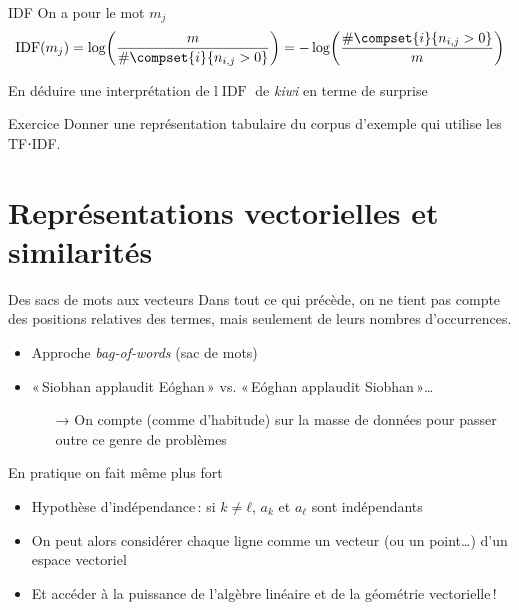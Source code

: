 \documentclass[hyperref={unicode}, xcolor={svgnames}, french]{beamer}
\DeclareMathOperator{\IDF}{IDF}
\begin{document}
\begin{frame}{IDF}
	On a pour le mot $m_j$
	\begin{equation}
		\IDF(m_j) = \log\mleft(\frac{m}{\#\compset{i}{n_{i,j}>0}}\mright) = -\log\mleft(\frac{\#\compset{i}{n_{i,j}>0}}{m}\mright)
	\end{equation}

	En déduire une interprétation de l$\IDF$ de \emph{kiwi} en terme de surprise
\end{frame}

\begin{frame}{Exercice}
	Donner une représentation tabulaire du corpus d'exemple qui utilise les TF⋅IDF.
\end{frame}

\section{Représentations vectorielles et similarités}

\begin{frame}{Des sacs de mots aux vecteurs}
    Dans tout ce qui précède, on ne tient pas compte des positions relatives des termes, mais seulement de leurs nombres d'occurrences.
    \begin{itemize}
        \item Approche \emph{bag-of-words} (sac de mots)
        \item « Siobhan applaudit Eóghan » vs. « Eóghan applaudit Siobhan »…
        \begin{itemize}
            \item[→] On compte (comme d'habitude) sur la masse de données pour passer outre ce genre de problèmes
        \end{itemize}
    \end{itemize}
    En pratique on fait même plus fort
    \begin{itemize}
        \item Hypothèse d'\alert{indépendance} : si $k≠ℓ$, $a_k$ et $a_ℓ$ sont indépendants
        \item On peut alors considérer chaque ligne comme un vecteur (ou un point…) d'un espace vectoriel
        \item Et accéder à la puissance de l'algèbre linéaire et de la géométrie vectorielle !
    \end{itemize}
\end{frame}
\end{document}
